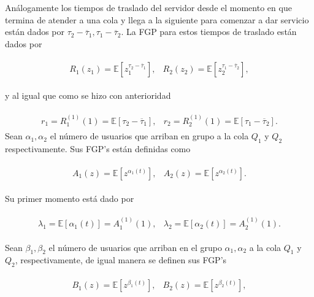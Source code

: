 \documentclass{article}
\newcommand{\esp}{\mathbb{E}}
\numberwithin{equation}{section}
\begin{document}
An\'alogamente los tiempos de traslado del servidor desde el momento en que termina de atender a una cola y llega a la siguiente para comenzar a dar servicio est\'an dados por $\tau_{2}-\overline{\tau}_{1},\tau_{1}-\overline{\tau}_{2}$. La FGP para estos tiempos de traslado est\'an dados por

\begin{eqnarray}
\begin{array}{cc}
R_{1}\left(z_{1}\right)=\esp\left[z_{1}^{\tau_{2}-\overline{\tau}_{1}}\right], & R_{2}\left(z_{2}\right)=\esp\left[z_{2}^{\tau_{1}-\overline{\tau}_{2}}\right],
\end{array}
\end{eqnarray}

y al igual que como se hizo con anterioridad

\begin{eqnarray}
\begin{array}{cc}
r_{1}=R_{1}^{(1)}\left(1\right)=\esp\left[\tau_{2}-\overline{\tau}_{1}\right], & r_{2}=R_{2}^{(1)}\left(1\right)=\esp\left[\tau_{1}-\overline{\tau}_{2}\right].
\end{array}
\end{eqnarray}
Sean $\alpha_{1},\alpha_{2}$ el n\'umero de usuarios que arriban
en grupo a la cola $Q_{1}$ y $Q_{2}$ respectivamente. Sus FGP's
est\'an definidas como

\begin{eqnarray}
\begin{array}{cc}
A_{1}\left(z\right)=\esp\left[z^{\alpha_{1}\left(t\right)}\right],&
A_{2}\left(z\right)=\esp\left[z^{\alpha_{2}\left(t\right)}\right].
\end{array}
\end{eqnarray}

Su primer momento est\'a dado por

\begin{eqnarray}
\begin{array}{cc}
\lambda_{1}=\esp\left[\alpha_{1}\left(t\right)\right]=A_{1}^{(1)}\left(1\right),&
\lambda_{2}=\esp\left[\alpha_{2}\left(t\right)\right]=A_{2}^{(1)}\left(1\right).
\end{array}
\end{eqnarray}

Sean $\beta_{1},\beta_{2}$ el n\'umero de usuarios que arriban en el grupo $\alpha_{1},\alpha_{2}$ a la cola $Q_{1}$ y $Q_{2}$, respectivamente, de igual manera se definen sus FGP's

\begin{eqnarray}
\begin{array}{cc}
B_{1}\left(z\right)=\esp\left[z^{\beta_{1}\left(t\right)}\right],&
B_{2}\left(z\right)=\esp\left[z^{\beta_{2}\left(t\right)}\right],
\end{array}
\end{eqnarray}
\end{document}
